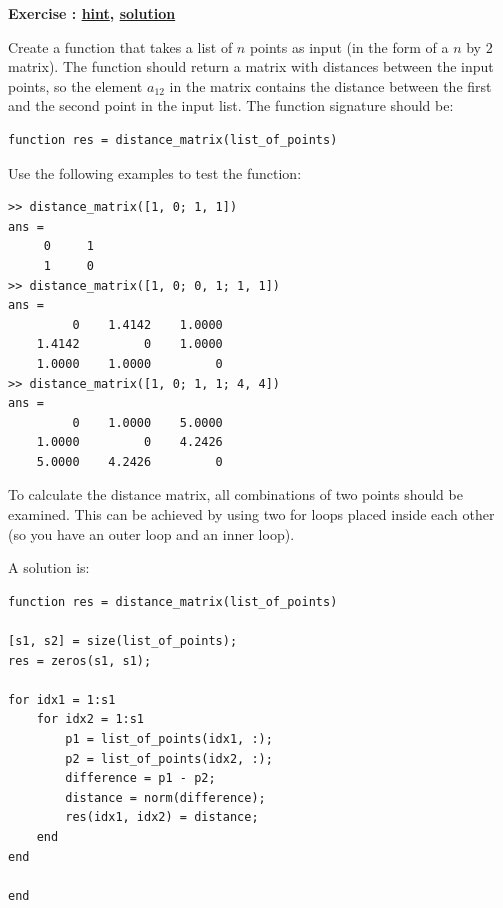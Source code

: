 \documentclass[12pt,a4paper]{article}
\makeatletter
\newcommand{\linkdest}[1]{\Hy@raisedlink{\hypertarget{#1}{}}}
\newcounter{ex}
\numberwithin{ex}{section}
\newenvironment{ex}[1][]{%
\filbreak
\bigskip
\refstepcounter{ex}
\noindent
\textbf{\linkdest{\theex{}exercise}{}Exercise \theex{}: #1\hfill\hyperlink{\theex{}hint}{hint}, \hyperlink{\theex{}solution}{solution}}\par\noindent}{}
\makeatother
\begin{document}
\begin{ex}
Create a function that takes a list of $n$ points as input 
(in the form of a $n$ by $2$ matrix).
The function should return a matrix with distances between 
the input points, so the element $a_{12}$ in the matrix 
contains the distance between the first and the second point
in the input list.
The function signature should be:
\begin{lstlisting}
function res = distance_matrix(list_of_points)
\end{lstlisting}
Use the following examples to test the function:
\begin{lstlisting}
>> distance_matrix([1, 0; 1, 1])
ans =
     0     1
     1     0
>> distance_matrix([1, 0; 0, 1; 1, 1])
ans =
         0    1.4142    1.0000
    1.4142         0    1.0000
    1.0000    1.0000         0
>> distance_matrix([1, 0; 1, 1; 4, 4])
ans =
         0    1.0000    5.0000
    1.0000         0    4.2426
    5.0000    4.2426         0
\end{lstlisting}
\begin{hint}
To calculate the distance matrix, all combinations
of two points should be examined.
This can be achieved by using two for loops placed 
inside each other (so you have an outer loop and an 
inner loop).
\end{hint}
\begin{sol}
A solution is:
\begin{lstlisting}
function res = distance_matrix(list_of_points)

[s1, s2] = size(list_of_points);
res = zeros(s1, s1);

for idx1 = 1:s1
    for idx2 = 1:s1
        p1 = list_of_points(idx1, :);
        p2 = list_of_points(idx2, :);
        difference = p1 - p2;
        distance = norm(difference);
        res(idx1, idx2) = distance;
    end
end

end
\end{lstlisting}
\end{sol}
\end{ex}
\end{document}
